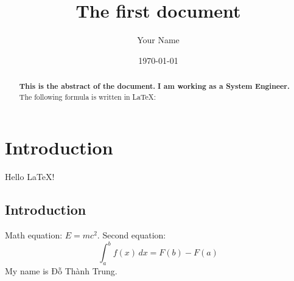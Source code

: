\documentclass{article}
\title{The first document }
\author{Your Name}
\date{\today}
\begin{document}
	
	\maketitle
	\section{Introduction}
	Hello LaTeX!
	\subsection{Introduction}
	Math equation: $E = mc^2$.
	Second equation:
	$$ \int_{a}^{b} f(x) \,dx = F(b) - F(a) $$
	My name is Đỗ Thành Trung.
	\begin{abstract}
		\textbf{This is the abstract of the document.}
		\textbf{I am working as a System Engineer.}
		The following formula is written in LaTeX:
	\end{abstract}
	
\end{document}
